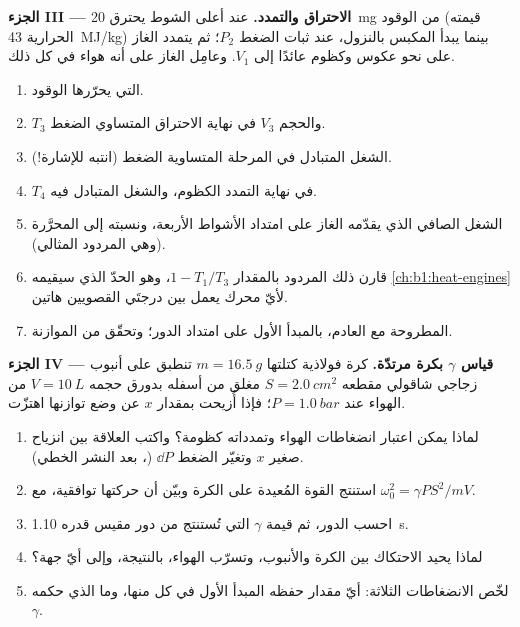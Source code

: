 \begin{problem}
\medskip
\noindent\textbf{الجزء III --- الاحتراق والتمدد.}
عند أعلى الشوط يحترق \qty{20}{mg} من الوقود (قيمته الحرارية
\qty{43}{MJ/kg}) بينما يبدأ المكبس بالنزول، عند ثبات الضغط
$P_2$؛ ثم يتمدد الغاز على نحو عكوس وكظوم عائدًا إلى $V_1$.
وعامِل الغاز على أنه هواء في كل ذلك.
\begin{enumerate}[resume]
  \item {} التي يحرّرها الوقود.
  \item {} $T_3$ والحجم $V_3$ في نهاية الاحتراق المتساوي
        الضغط.
  \item الشغل المتبادل في المرحلة المتساوية الضغط (انتبه للإشارة!).
  \item {} $T_4$ في نهاية التمدد الكظوم، والشغل
        المتبادل فيه.
  \item الشغل الصافي الذي يقدّمه الغاز على امتداد الأشواط الأربعة،
        ونسبته إلى  المحرَّرة (وهي المردود المثالي).
  \item قارن ذلك المردود بالمقدار $1 - T_1/T_3$، وهو الحدّ الذي
        سيقيمه \cref{ch:b1:heat-engines} لأيّ محرك يعمل
        بين درجتَي  القصويين هاتين.
  \item {} المطروحة مع العادم، بالمبدأ الأول على امتداد الدور؛
        وتحقّق من الموازنة.
\end{enumerate}

\medskip
\noindent\textbf{الجزء IV --- قياس $\gamma$ بكرة مرتدّة.}
كرة فولاذية كتلتها $m = \qty{16.5}{g}$ تنطبق على أنبوب زجاجي شاقولي
مقطعه $S = \qty{2.0}{cm^2}$ مغلق من أسفله بدورق حجمه
$V = \qty{10}{L}$ من الهواء عند $P = \qty{1.0}{bar}$؛ فإذا أُزيحت بمقدار $x$
عن وضع توازنها اهتزّت.
\begin{enumerate}[resume]
  \item لماذا يمكن اعتبار انضغاطات الهواء وتمدداته كظومة؟ واكتب
        العلاقة بين انزياح صغير $x$ وتغيّر الضغط $\dd P$ (، بعد النشر الخطي).
  \item استنتج القوة المُعيدة على الكرة وبيّن أن حركتها
        توافقية، مع $\omega_0^2 = \gamma PS^2/mV$.
  \item احسب الدور، ثم قيمة $\gamma$ التي تُستنتج من دور
        مقيس قدره \qty{1.10}{s}.
  \item لماذا يحيد الاحتكاك بين الكرة والأنبوب، وتسرّب الهواء،
        بالنتيجة، وإلى أيّ جهة؟
  \item لخّص الانضغاطات الثلاثة: أيّ مقدار حفظه المبدأ الأول في
        كل منها، وما الذي حكمه  $\gamma$.
\end{enumerate}
\end{problem}
